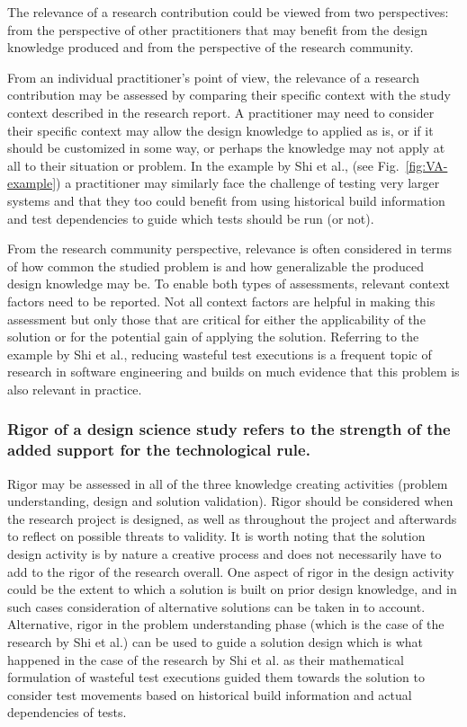 \documentclass[graybox]{svmult}
\begin{document}
The relevance of a research contribution could be viewed from two perspectives: from the perspective of other practitioners that may benefit from the design knowledge produced and from the perspective of the research community. 

From an individual practitioner's point of view, the relevance of a research contribution may be assessed by comparing their specific context with the study context described in the research report. 
A practitioner may need to consider their specific context may allow the design knowledge to applied as is, or if it should be customized in some way, or perhaps the knowledge may not apply at all to their situation or problem.
In the example by Shi et al., (see Fig.~\ref{fig:VA-example}) a practitioner may similarly face the challenge of testing very larger systems and  that they too could benefit from using historical build information and test dependencies to guide which tests should be run (or not).

From the research community perspective, relevance is often considered in terms of how common the studied problem is and how generalizable the produced design knowledge may be. To enable both types of assessments, relevant context factors need to be reported. Not all context factors are helpful in making this assessment but only those that are critical for either the applicability of the solution or for the potential gain of applying the solution. 
Referring to the example by Shi et al., reducing wasteful test executions is a frequent topic of research in software engineering and builds on much evidence that this problem is also relevant in practice.

\subsubsection{Rigor of a design science study refers to the strength of the added support for the technological rule.} Rigor may be assessed in all of the three knowledge creating activities (problem understanding, design and solution validation). 
Rigor should be considered when the research project is designed, as well as throughout the project and afterwards to reflect on possible threats to validity. 
It is worth noting that the solution design activity is by nature a creative process and does not necessarily have to add to the rigor of the research overall. One aspect of rigor in the design activity could be the extent to which a solution is built on prior design knowledge, and in such cases consideration of alternative solutions can be taken in to account. 
Alternative, rigor in the problem understanding phase (which is the case of the research by Shi et al.) can be used to guide a solution design which is what happened in the case of the research by Shi et al. as their mathematical formulation of wasteful test executions guided them towards the solution to consider test movements based on historical build information and actual dependencies of tests. 
\end{document}
